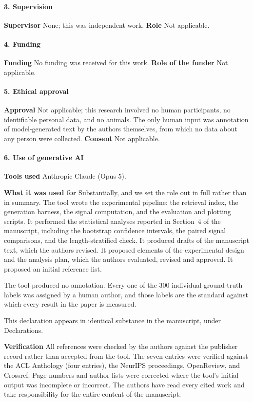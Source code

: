 \documentclass[11pt,a4paper]{article}
\begin{document}
\paragraph{3. Supervision}
\textbf{Supervisor} None; this was independent work.
\textbf{Role} Not applicable.

\paragraph{4. Funding}
\textbf{Funding} No funding was received for this work.
\textbf{Role of the funder} Not applicable.

\paragraph{5. Ethical approval}
\textbf{Approval} Not applicable; this research involved no human participants,
no identifiable personal data, and no animals. The only human input was
annotation of model-generated text by the authors themselves, from which no
data about any person were collected.
\textbf{Consent} Not applicable.

\paragraph{6. Use of generative AI}
\textbf{Tools used} Anthropic Claude (Opus 5).

\textbf{What it was used for} Substantially, and we set the role out in full
rather than in summary. The tool wrote the experimental pipeline: the retrieval
index, the generation harness, the signal computation, and the evaluation and
plotting scripts. It performed the statistical analyses reported in Section~4 of
the manuscript, including the bootstrap confidence intervals, the paired signal
comparisons, and the length-stratified check. It produced drafts of the
manuscript text, which the authors revised. It proposed elements of the
experimental design and the analysis plan, which the authors evaluated, revised
and approved. It proposed an initial reference list.

The tool produced no annotation. Every one of the 300 individual ground-truth
labels was assigned by a human author, and those labels are the standard against
which every result in the paper is measured.

This declaration appears in identical substance in the manuscript, under
Declarations.

\textbf{Verification} All references were checked by the authors against the
publisher record rather than accepted from the tool. The seven entries were
verified against the ACL Anthology (four entries), the NeurIPS proceedings,
OpenReview, and Crossref. Page numbers and author lists were corrected where the
tool's initial output was incomplete or incorrect. The authors have read every
cited work and take responsibility for the entire content of the manuscript.
\end{document}
